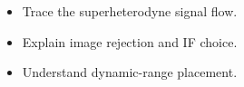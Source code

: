 \begin{objectives}
\begin{itemize}[leftmargin=1.4em,itemsep=2pt]
\item Trace the superheterodyne signal flow.
\item Explain image rejection and IF choice.
\item Understand dynamic-range placement.
\end{itemize}
\end{objectives}

